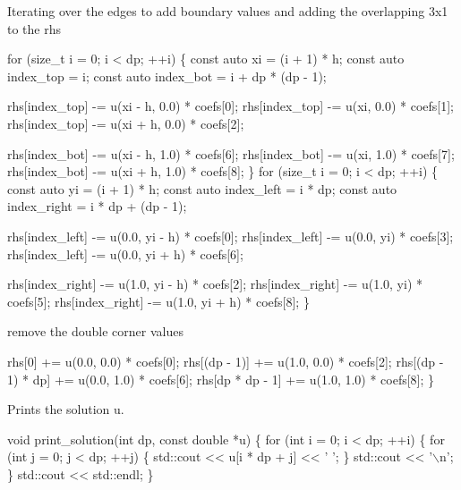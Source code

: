 Iterating over the edges to add boundary values and adding the overlapping 3x1 to the rhs


\begin{DoxyCode}
\textcolor{keywordflow}{for} (\textcolor{keywordtype}{size\_t} i = 0; i < dp; ++i) \{
    \textcolor{keyword}{const} \textcolor{keyword}{auto} xi = (i + 1) * h;
    \textcolor{keyword}{const} \textcolor{keyword}{auto} index\_top = i;
    \textcolor{keyword}{const} \textcolor{keyword}{auto} index\_bot = i + dp * (dp - 1);

    rhs[index\_top] -= u(xi - h, 0.0) * coefs[0];
    rhs[index\_top] -= u(xi, 0.0) * coefs[1];
    rhs[index\_top] -= u(xi + h, 0.0) * coefs[2];

    rhs[index\_bot] -= u(xi - h, 1.0) * coefs[6];
    rhs[index\_bot] -= u(xi, 1.0) * coefs[7];
    rhs[index\_bot] -= u(xi + h, 1.0) * coefs[8];
\}
\textcolor{keywordflow}{for} (\textcolor{keywordtype}{size\_t} i = 0; i < dp; ++i) \{
    \textcolor{keyword}{const} \textcolor{keyword}{auto} yi = (i + 1) * h;
    \textcolor{keyword}{const} \textcolor{keyword}{auto} index\_left = i * dp;
    \textcolor{keyword}{const} \textcolor{keyword}{auto} index\_right = i * dp + (dp - 1);

    rhs[index\_left] -= u(0.0, yi - h) * coefs[0];
    rhs[index\_left] -= u(0.0, yi) * coefs[3];
    rhs[index\_left] -= u(0.0, yi + h) * coefs[6];

    rhs[index\_right] -= u(1.0, yi - h) * coefs[2];
    rhs[index\_right] -= u(1.0, yi) * coefs[5];
    rhs[index\_right] -= u(1.0, yi + h) * coefs[8];
\}
\end{DoxyCode}


remove the double corner values


\begin{DoxyCode}
    rhs[0] += u(0.0, 0.0) * coefs[0];
    rhs[(dp - 1)] += u(1.0, 0.0) * coefs[2];
    rhs[(dp - 1) * dp] += u(0.0, 1.0) * coefs[6];
    rhs[dp * dp - 1] += u(1.0, 1.0) * coefs[8];
\}
\end{DoxyCode}


Prints the solution {\ttfamily u}.


\begin{DoxyCode}
\textcolor{keywordtype}{void} print\_solution(\textcolor{keywordtype}{int} dp, \textcolor{keyword}{const} \textcolor{keywordtype}{double} *u)
\{
    \textcolor{keywordflow}{for} (\textcolor{keywordtype}{int} i = 0; i < dp; ++i) \{
        \textcolor{keywordflow}{for} (\textcolor{keywordtype}{int} j = 0; j < dp; ++j) \{
            std::cout << u[i * dp + j] << \textcolor{charliteral}{' '};
        \}
        std::cout << \textcolor{charliteral}{'\(\backslash\)n'};
    \}
    std::cout << std::endl;
\}
\end{DoxyCode}


